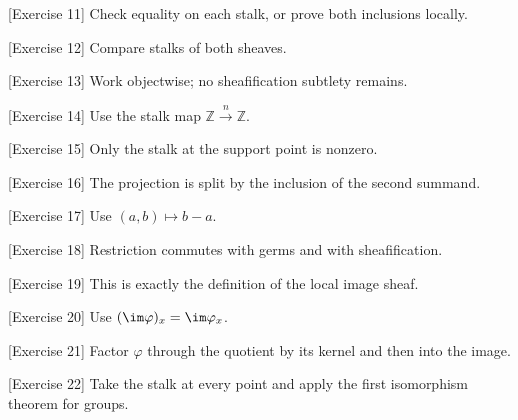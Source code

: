 \begin{hint}
[Exercise 11]
Check equality on each stalk, or prove both inclusions locally.
\end{hint}

\begin{hint}
[Exercise 12]
Compare stalks of both sheaves.
\end{hint}

\begin{hint}
[Exercise 13]
Work objectwise; no sheafification subtlety remains.
\end{hint}

\begin{hint}
[Exercise 14]
Use the stalk map $\mathbb Z\xrightarrow{n}\mathbb Z$.
\end{hint}

\begin{hint}
[Exercise 15]
Only the stalk at the support point is nonzero.
\end{hint}

\begin{hint}
[Exercise 16]
The projection is split by the inclusion of the second summand.
\end{hint}

\begin{hint}
[Exercise 17]
Use $(a,b)\mapsto b-a$.
\end{hint}

\begin{hint}
[Exercise 18]
Restriction commutes with germs and with sheafification.
\end{hint}

\begin{hint}
[Exercise 19]
This is exactly the definition of the local image sheaf.
\end{hint}

\begin{hint}
[Exercise 20]
Use $(\im\varphi)_x=\im\varphi_x$.
\end{hint}

\begin{hint}
[Exercise 21]
Factor $\varphi$ through the quotient by its kernel and then into the image.
\end{hint}

\begin{hint}
[Exercise 22]
Take the stalk at every point and apply the first isomorphism theorem for groups.
\end{hint}

